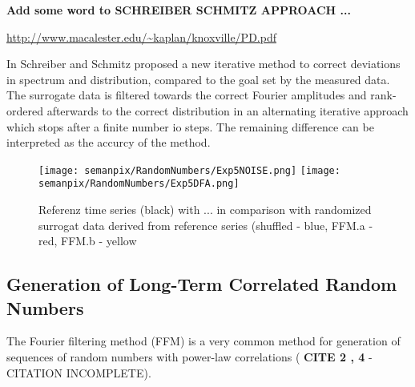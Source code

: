 \documentclass[a4paper,10pt]{scrbook}
\begin{document}
\textbf{Add some word to SCHREIBER SCHMITZ APPROACH ...}

\url{http://www.macalester.edu/~kaplan/knoxville/PD.pdf}

In \cite{Schreiber1996} Schreiber and Schmitz proposed a new iterative  method to correct deviations in spectrum and distribution, compared to the goal set by the measured data. The surrogate data is filtered towards the correct Fourier amplitudes
and rank-ordered afterwards to the correct distribution in an alternating iterative approach which stops after a finite number io steps. The remaining difference can be interpreted as the accurcy of the method.




%
%
%
\begin{figure}[htp]
 \centering
 \centering
\texttt{[image: semanpix/RandomNumbers/Exp5NOISE.png]}
\texttt{[image: semanpix/RandomNumbers/Exp5DFA.png]}
\caption{Referenz time series (black) with ... in comparison with randomized surrogat data derived from reference series (shuffled - blue, FFM.a - red, FFM.b - yellow} 

 \label{fig:rand_num_dists}
\end{figure}



 
 


\subsection{Generation of Long-Term Correlated Random Numbers}
\label{FFM} 

%

The Fourier filtering method (FFM) is a very common method for generation of sequences of random numbers with power-law correlations ( \cite{PhysRevA.46.R1724} \textbf{CITE 2 , 4}  - CITATION INCOMPLETE).

\end{document}
